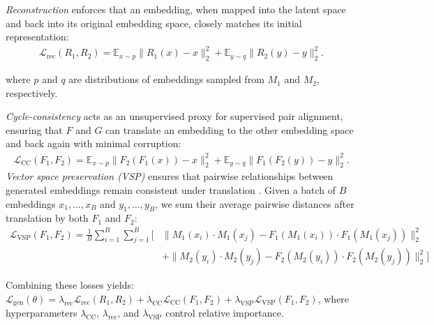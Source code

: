 \textit{Reconstruction} enforces that an embedding, when mapped into the latent space and back into its original embedding space, closely matches its initial representation:
\begin{align*}
    \mathcal{L}_{\text{rec}}(R_1,R_2) = \mathbb{E}_{x \sim p}\|R_1(x)-x\|_2^2 + \mathbb{E}_{y \sim q}\|R_2(y)-y\|_2^2.
\end{align*}

where $p$ and $q$ are distributions of embeddings sampled from $M_1$ and $M_2$, respectively.

\textit{Cycle-consistency} acts as an unsupervised proxy for supervised pair alignment, ensuring that $F$ and $G$ can translate an embedding to the other embedding space and back again with minimal corruption:
\begin{align*}
    \mathcal{L}_{\text{CC}}(F_1,F_2) = \mathbb{E}_{x \sim p}\|F_2(F_1(x))-x\|_2^2 + \mathbb{E}_{y \sim q}\|F_1(F_2(y))-y\|_2^2.
\end{align*}
\textit{Vector space preservation (VSP)} ensures that pairwise relationships between generated embeddings remain consistent under translation \citep{mrksic2016counterfittingwordvectorslinguistic, yoon2025embeddingconverter}. Given a batch of $B$ embeddings $x_1, ..., x_B$ and $y_1, ..., y_B$, we sum their average pairwise distances after translation by both $F_1$ and $F_2$:
\begin{align*}
    \mathcal{L}_{\text{VSP}}(F_1,F_2) = \frac{1}{B} \sum_{i=1}^{B} \sum_{j=1}^{B} \bigg[ & \|M_1(x_i) \cdot M_1(x_j) - F_1(M_1(x_i)) \cdot F_1(M_1(x_j))\|_2^2 \\
    & +  \|M_2(y_i) \cdot M_2(y_j) - F_2(M_2(y_i)) \cdot F_2(M_2(y_j))\|_2^2 \bigg]
\end{align*}

Combining these losses yields:
$\mathcal{L}_{\text{gen}}(\theta) = \lambda_{\text{rec}}\mathcal{L}_{\text{rec}}(R_1,R_2) + \lambda_{\text{CC}}\mathcal{L}_{\text{CC}}(F_1,F_2) + \lambda_{\text{VSP}}\mathcal{L}_{\text{VSP}}(F_1,F_2)$, where hyperparameters $\lambda_{\text{CC}}$, $\lambda_{\text{rec}}$, and $\lambda_{\text{VSP}}$ control relative importance.


